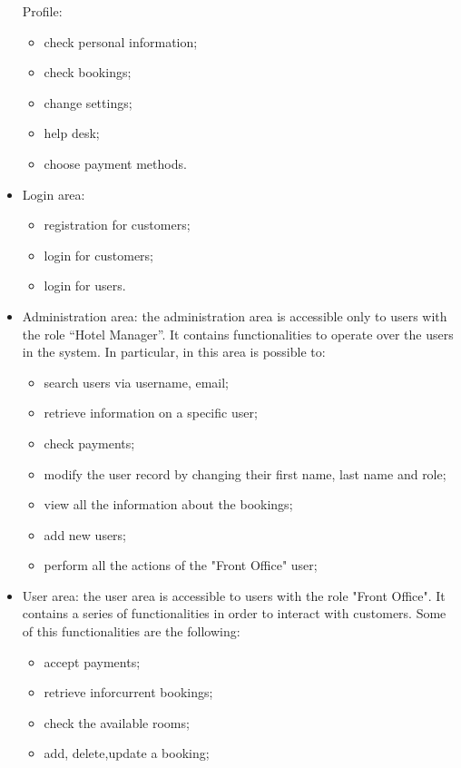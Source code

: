 \begin{itemize}
    Profile:
    \begin{itemize}
        \item check personal information;
        \item check bookings;
        \item change settings;
        \item help desk;
        \item choose payment methods.
    \end{itemize}
    \item Login area:
    \begin{itemize}
        \item registration for customers;
        \item login for customers;
        \item login for users.
    \end{itemize}
    \item Administration area: the administration area is accessible only to users with the role “Hotel Manager”. It contains functionalities to operate over the users in the system. In particular, in this area is possible to:
    \begin{itemize}
        \item search users via username, email;
        \item retrieve information on a specific user;
        \item check payments;
        \item modify the user record by changing their first name, last name and role;
        \item view all the information about the bookings; 
        \item add new users;
        \item perform all the actions of the "Front Office" user;
    \end{itemize}
        \item User area: the user area is accessible to users with the role "Front Office". It contains a series of functionalities in order to interact with customers. Some of this functionalities are the following: 
    \begin{itemize}
        \item accept payments;
        \item retrieve inforcurrent bookings;
        \item check the available rooms;
        \item add, delete,update a booking;        
    \end{itemize}
\end{itemize}



